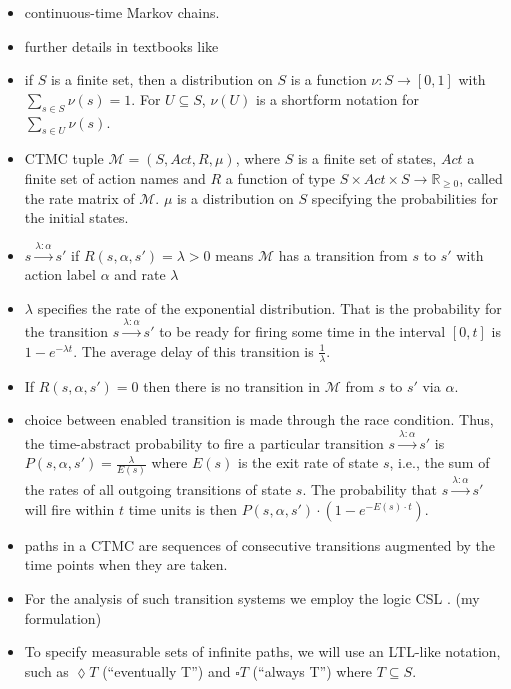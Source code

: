 \documentclass[a4paper, 10pt]{article}
\begin{document}
\begin{itemize}
	\item continuous-time Markov chains.
	\item further details in textbooks like \cite{kul95, ks76}
	\item if $S$ is a finite set, then a distribution on $S$ is a function $\nu:S \rightarrow [0,1]$ with $\sum\limits_{s \in S} \nu (s) = 1$. For $U \subseteq S$, $\nu (U)$ is a shortform notation for $\sum\limits_{s \in U} \nu (s)$.
	\item CTMC tuple $\mathcal{M} = (S, \mathit{Act}, R, \mu)$, where $S$ is a finite set of states, $Act$ a finite set of action names and $R$ a function of type $S \times \mathit{Act} \times S \rightarrow \mathbb{R}_{\ge 0}$, called the rate matrix of $\mathcal{M}$. $\mu$ is a distribution on $S$ specifying the probabilities for the initial states.
	\item $s \xrightarrow{\lambda : \alpha} s'$ if $R(s, \alpha, s') = \lambda > 0$ means $\mathcal{M}$ has a transition from $s$ to $s'$ with action label $\alpha$ and rate $\lambda$
	\item $\lambda$ specifies the rate of the exponential distribution. That is the probability for the transition $s \xrightarrow{\lambda : \alpha} s'$ to be ready for firing some time in the interval $[0,t]$ is $1-e^{- \lambda t}$. The average delay  of this transition is $\frac{1}{\lambda}$.
	\item If $R(s, \alpha, s') = 0$ then there is no transition in $\mathcal{M}$ from $s$ to $s'$ via $\alpha$.
	\item choice between enabled transition is made through the race condition. Thus, the time-abstract probability to fire a particular transition $s \xrightarrow{\lambda : \alpha} s'$ is $P(s, \alpha, s') = \frac{\lambda}{E(s)}$ where $E(s)$ is the exit rate of state $s$, i.e., the sum of the rates of all outgoing transitions of state $s$. The probability that $s \xrightarrow{\lambda : \alpha} s'$ will fire within $t$ time units is then $P(s, \alpha, s') \cdot (1 - e^{- E(s) \cdot t})$.
	\item paths in a CTMC are sequences of consecutive transitions augmented by the time points when they are taken.
	\item For the analysis of such transition systems we employ the logic CSL \cite{assb96, bhhk00, knp07}. (my formulation)
	\item To specify measurable sets of infinite paths, we will use an LTL-like notation, such as $\lozenge T$ (``eventually T'') and $\square T$ (``always T'') where $T \subseteq S$.

\end{itemize}
\end{document}
